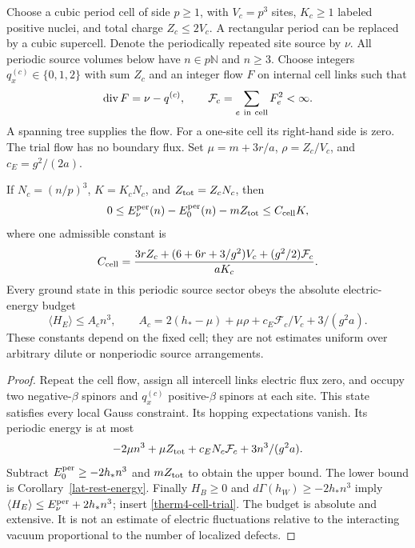 Choose a cubic period cell of side $p\ge1$, with $V_c=p^3$ sites,
$K_c\ge1$ labeled positive nuclei, and total charge
$Z_c\le2V_c$.  A rectangular period can be replaced by a cubic
supercell.  Denote the periodically repeated site source by $\nu$.
All periodic source volumes below have $n\in p\mathbb N$ and $n\ge3$.
Choose integers $q_x^{(c)}\in\{0,1,2\}$ with sum $Z_c$ and an
integer flow $F$ on internal cell links such that
\begin{equation}
 \operatorname{div}F=\nu-q^{(c)},\qquad
 \mathcal F_c=\sum_{e\ {\rm in\ cell}}F_e^2<\infty.
 \label{therm4-cell-flow}
\end{equation}
A spanning tree supplies the flow.  For a one-site cell its right-hand
side is zero.  The trial flow has no boundary flux.
Set $\mu=m+3r/a$, $\rho=Z_c/V_c$, and $c_E=g^2/(2a)$.

\begin{proposition}
\label{therm4-cell-bounds}
If $N_c=(n/p)^3$, $K=K_cN_c$, and $Z_{\rm tot}=Z_cN_c$, then
\begin{equation}
 0\le E_\nu^{\rm per}(n)-E_0^{\rm per}(n)-mZ_{\rm tot}
       \le C_{\rm cell}K,
 \label{therm4-cell-relative}
\end{equation}
where one admissible constant is
\begin{equation}
 C_{\rm cell}=
 \frac{3rZ_c+(6+6r+3/g^2)V_c+(g^2/2)\mathcal F_c}{aK_c}.
 \label{therm4-cell-constant}
\end{equation}
Every ground state in this periodic source sector obeys the absolute
electric-energy budget
\begin{equation}
 \langle H_E\rangle\le A_c n^3,\qquad
 A_c=2(h_*-\mu)+\mu\rho
            +c_E\mathcal F_c/V_c+3/(g^2a).
 \label{therm4-electric-budget}
\end{equation}
These constants depend on the fixed cell; they are not estimates
uniform over arbitrary dilute or nonperiodic source arrangements.
\end{proposition}
\begin{proof}
Repeat the cell flow, assign all intercell links electric flux zero,
and occupy two negative-$\beta$ spinors and $q_x^{(c)}$ positive-$\beta$
spinors at each site.  This state satisfies every local Gauss
constraint.  Its hopping expectations vanish.  Its periodic energy is
at most
\begin{equation}
 -2\mu n^3+\mu Z_{\rm tot}
       +c_E N_c\mathcal F_c+3n^3/(g^2a).
 \label{therm4-cell-trial}
\end{equation}
Subtract $E_0^{\rm per}\ge-2h_*n^3$ and $mZ_{\rm tot}$ to obtain the
upper bound.  The lower bound is Corollary~\ref{lat-rest-energy}.
Finally $H_B\ge0$ and $d\Gamma(h_W)\ge-2h_*n^3$ imply
$\langle H_E\rangle\le E_\nu^{\rm per}+2h_*n^3$; insert
\eqref{therm4-cell-trial}.  The budget is absolute and extensive.
It is not an estimate of electric fluctuations relative to the
interacting vacuum proportional to the number of localized defects.
\end{proof}

